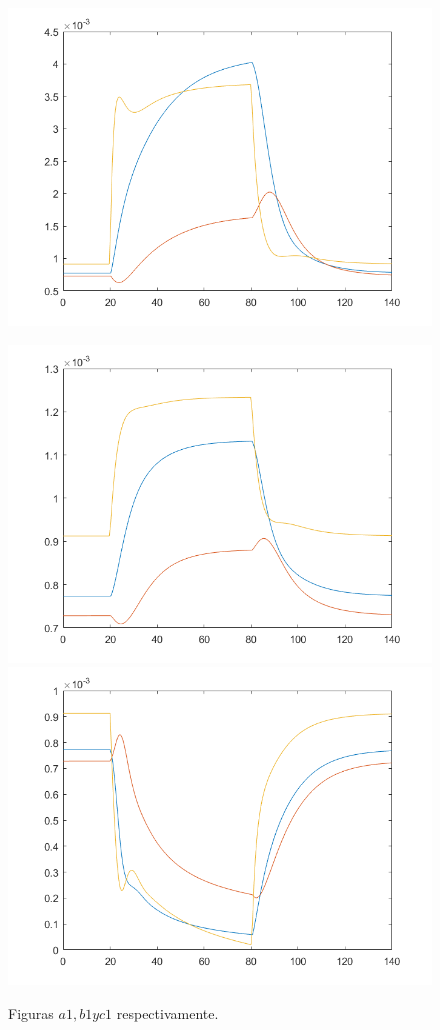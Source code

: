 \begin{figure}[h!]
\includegraphics[scale=0.3]{../c1.png}\\
\caption{Figuras $a1, b1 y c1$ respectivamente.}
\includegraphics[scale=0.3]{../a2.png}\hspace{0.01cm}
\includegraphics[scale=0.3]{../b2.png}\hspace{0.01cm}

\end{figure}
